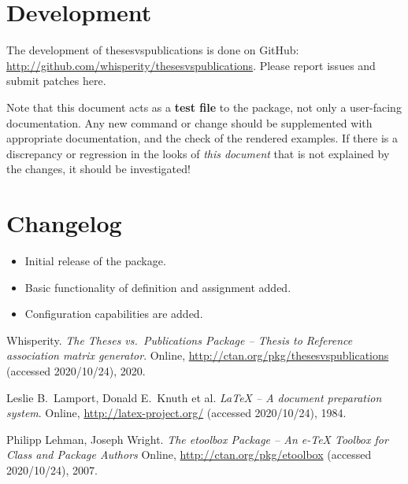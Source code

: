 \documentclass{article}
\begin{document}
\section{Development}
The development of \textsf{thesesvspublications} is done on GitHub: \url{http://github.com/whisperity/thesesvspublications}.
Please report issues and submit patches here.

Note that this document acts as a \textbf{test file} to the package, not only a user-facing documentation.
Any new command or change should be supplemented with appropriate documentation, and the check of the rendered examples.
If there is a discrepancy or regression in the looks of \emph{this document} that is not explained by the changes, it should be investigated!

\section{Changelog}\label{changelog}
\begin{itemize}
    \item Initial release of the package.
    \item Basic functionality of definition and assignment added.
    \item Configuration capabilities are added.
\end{itemize}


\begin{thebibliography}{3}
Whisperity. \textit{The \textsf{Theses vs.\ Publications} Package -- Thesis to Reference association matrix generator}.
Online, \url{http://ctan.org/pkg/thesesvspublications} (accessed 2020/10/24), 2020.

Leslie B.\ Lamport, Donald E.\ Knuth et al. 
\textit{\LaTeX{} -- A document preparation system}. 
Online, \url{http://latex-project.org/} (accessed 2020/10/24), 1984.

Philipp Lehman, Joseph Wright.
\textit{The \textsf{etoolbox} Package -- An e-\TeX{} Toolbox for Class and Package Authors}
Online, \url{http://ctan.org/pkg/etoolbox} (accessed 2020/10/24), 2007.
\end{thebibliography}
\end{document}
